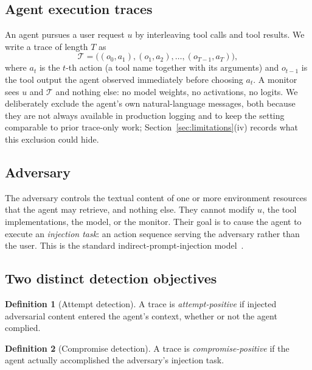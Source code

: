 \documentclass[preprint,12pt,authoryear]{elsarticle}
\theoremstyle{definition}
\newtheorem{definition}{Definition}
\newcommand{\Tcal}{\mathcal{T}}
\begin{document}
\subsection{Agent execution traces}

An agent pursues a user request $u$ by interleaving tool calls and tool results.
We write a trace of length $T$ as
\begin{equation}
\Tcal = \big( (o_0, a_1), (o_1, a_2), \dots, (o_{T-1}, a_T) \big),
\end{equation}
where $a_t$ is the $t$-th action (a tool name together with its arguments) and
$o_{t-1}$ is the tool output the agent observed immediately before choosing
$a_t$. A monitor sees $u$ and $\Tcal$ and nothing else: no model weights, no
activations, no logits. We deliberately exclude the agent's own
natural-language messages, both because they are not always available in
production logging and to keep the setting comparable to prior trace-only
work; Section~\ref{sec:limitations}(iv) records what this exclusion could hide.

\subsection{Adversary}

The adversary controls the textual content of one or more environment resources
that the agent may retrieve, and nothing else. They cannot modify $u$, the tool
implementations, the model, or the monitor. Their goal is to cause the agent to
execute an \emph{injection task}: an action sequence serving the adversary rather
than the user. This is the standard indirect-prompt-injection
model~\citep{debenedetti2024agentdojo}.

\subsection{Two distinct detection objectives}

\begin{definition}[Attempt detection]
A trace is \emph{attempt-positive} if injected adversarial content entered the
agent's context, whether or not the agent complied.
\end{definition}

\begin{definition}[Compromise detection]
A trace is \emph{compromise-positive} if the agent actually accomplished the
adversary's injection task.
\end{definition}
\end{document}
